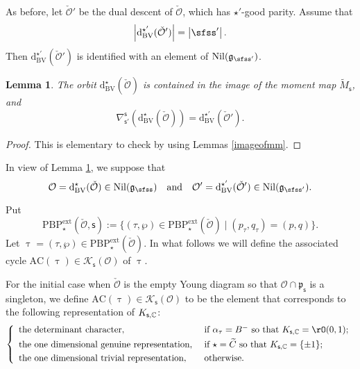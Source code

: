 \documentclass[12pt,a4paper]{amsart}
\def\abs#1{\left|{#1}\right|}
\newcommand{\CK}{{\mathcal {K}}}
\newcommand{\CO}{{\mathcal {O}}}
\newcommand{\g}{\mathfrak g}
\newcommand{\p}{\mathfrak p}
\numberwithin{equation}{section}
\newtheorem{lem}[thm]{Lemma}
\theoremstyle{remark}
\def\PBPe{\mathrm{PBP}^{\mathrm{ext}}}
\begin{document}

As before, let $\check \CO'$ be the dual descent of $\check \CO$, which has $\star'$-good parity. Assume that
\[
  \abs{\mathrm d_{\mathrm{BV}}^{\star'}(\check \CO')}=\abs{\sfss'}.
\]
Then  $\mathrm d_{\mathrm{BV}}^{\star'}(\check \CO')$ is identified with an element of $\mathrm{Nil}(\g_{\sfss'})$. 

\begin{lem}\label{dualdesc}
The orbit $\mathrm d_{\mathrm{BV}}^{\star}(\check \CO)$ is contained in the image of the moment map $\tilde M_{\mathsf s}$, and
\[
  \nabla_{\mathsf s'}^{\mathsf s}(\mathrm d_{\mathrm{BV}}^{\star}(\check \CO))=\mathrm d_{\mathrm{BV}}^{\star'}(\check \CO').
\]
\end{lem}
\begin{proof}
This is elementary to check by using Lemmas \ref{imageofmm}.
\end{proof}

In view of Lemma \ref{dualdesc}, we suppose that 
\[
\CO=\mathrm d_{\mathrm{BV}}^\star(\check \CO)\in \mathrm{Nil}(\g_\sfss)\quad \textrm{and}\quad \CO'=\mathrm d_{\mathrm{BV}}^{\star'}(\check \CO')\in \mathrm{Nil}(\g_{\sfss'}).
\] 

Put
\[
  \PBPe_\star(\check \CO,\mathsf s):=\{(\tau, \wp)\in  \PBPe_\star(\check \CO)\mid (p_\tau,q_\tau)=(p,q)\}.
\]
Let $\uptau=(\tau, \wp)\in \PBPe_\star(\check \CO)$. 
In what follows we will define the associated cycle $\mathrm{AC}(\uptau)\in\CK_{\mathsf s}(\CO)$ of $\uptau$.

For the initial case when $\check \CO$ is the empty Young diagram so that $\CO\cap \p_{\mathsf s}$ is a singleton, we define  $\mathrm{AC}(\uptau)\in\CK_{\mathsf s}(\CO)$ to be the element that corresponds to the following  representation of $K_{\mathsf s,\mathbb{C}}$: 
 \[
\left\{
     \begin{array}{ll}
                    \textrm{the determinant character} , &\hbox{ if $\alpha_\tau=B^-$ so that $K_{\mathsf s,\C}=\rO(0,1)$;} \smallskip\\
                    \textrm{the one dimensional genuine representation} , &\hbox{ if $\star=\widetilde C$ so that $K_{\mathsf s,\C}=\{\pm 1\}$;} \smallskip\\
 \textrm{the one dimensional trivial representation} , &\hbox{ otherwise.}            \end{array}
   \right.
\]
\end{document}
